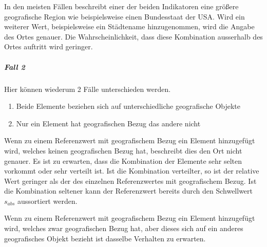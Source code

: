 							In den meisten Fällen beschreibt einer der beiden Indikatoren eine größere geografische Region wie beispielsweise einen Bundesstaat der USA.
							Wird ein weiterer Wert, beispielsweise ein Städtename hinzugenommen, wird die Angabe des Ortes genauer. 
							Die Wahrscheinlichkeit, dass diese Kombination ausserhalb des Ortes auftritt wird geringer. 

					\subparagraph{Fall 2}

						Hier können wiederum 2 Fälle unterschieden werden.

						\begin{enumerate}
							\item Beide Elemente beziehen sich auf unterschiedliche geografische Objekte
							\item Nur ein Element hat geografischen Bezug das andere nicht 
						\end{enumerate}

						Wenn zu einem Referenzwert mit geografischem Bezug ein Element hinzugefügt wird, welches keinen geografischen Bezug hat, beschreibt dies den Ort nicht genauer.
						Es ist zu erwarten, dass die Kombination der Elemente sehr selten vorkommt oder sehr verteilt ist. 
						Ist die Kombination verteilter, so ist der relative Wert geringer als der des einzelnen Referenzwertes mit geografischem Bezug.
						Ist die Kombination seltener kann der Referenzwert bereits durch den Schwellwert $s_{abs}$ aussortiert werden.		

						Wenn zu einem Referenzwert mit geografischem Bezug ein Element hinzugefügt wird, welches zwar geografischen Bezug hat, aber dieses sich auf ein anderes geografisches Objekt bezieht ist dasselbe Verhalten zu erwarten.

	\newpage
	
	
			
		



	
